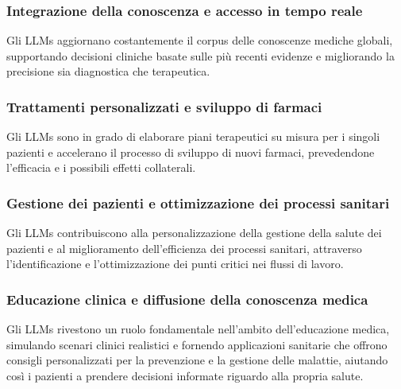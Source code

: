 \subsubsection{Integrazione della conoscenza e accesso in tempo reale}
Gli LLMs aggiornano costantemente il corpus delle conoscenze mediche globali, supportando decisioni cliniche basate sulle più recenti evidenze e migliorando la precisione sia diagnostica che terapeutica.

\subsubsection{Trattamenti personalizzati e sviluppo di farmaci}
Gli LLMs sono in grado di elaborare piani terapeutici su misura per i singoli pazienti e accelerano il processo di sviluppo di nuovi farmaci, prevedendone l'efficacia e i possibili effetti collaterali.

\subsubsection{Gestione dei pazienti e ottimizzazione dei processi sanitari}
Gli LLMs contribuiscono alla personalizzazione della gestione della salute dei pazienti e al miglioramento dell'efficienza dei processi sanitari, attraverso l'identificazione e l'ottimizzazione dei punti critici nei flussi di lavoro.

\subsubsection{Educazione clinica e diffusione della conoscenza medica}
Gli LLMs rivestono un ruolo fondamentale nell'ambito dell'educazione medica, simulando scenari clinici realistici e fornendo applicazioni sanitarie che offrono consigli personalizzati per la prevenzione e la gestione delle malattie, aiutando così i pazienti a prendere decisioni informate riguardo alla propria salute.

